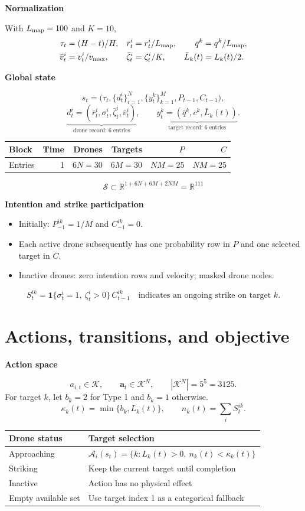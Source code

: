 \documentclass[11pt,a4paper]{article}
\newcommand{\ind}{\mathbf 1}
\newcommand{\R}{\mathbb R}
\newcommand{\lead}[1]{\medskip\textbf{#1}\par}
\begin{document}
\lead{Normalization}
With $L_{\rm map}=100$ and $K=10$,
\begin{align*}
\tau_t&=(H-t)/H,& \bar r_t^i&=r_t^i/L_{\rm map},& \bar q^k&=q^k/L_{\rm map},\\
\bar v_t^i&=v_t^i/v_{\max},& \bar\zeta_t^i&=\zeta_t^i/K,& \bar L_k(t)&=L_k(t)/2.
\end{align*}

\lead{Global state}
\[
s_t=\bigl(\tau_t,\{d_t^i\}_{i=1}^N,\{y_t^k\}_{k=1}^M,P_{t-1},C_{t-1}\bigr),
\]
\[
\underbrace{d_t^i=(\bar r_t^i,\sigma_t^i,\bar\zeta_t^i,\bar v_t^i)}_{\text{drone record: 6 entries}},
\qquad
\underbrace{y_t^k=(\bar q^k,c^k,\bar L_k(t))}_{\text{target record: 6 entries}}.
\]
\begin{center}
\begin{tabular}{@{}lrrrrr@{}}
\toprule
Block & Time & Drones & Targets & $P$ & $C$ \\
\midrule
Entries & 1 & $6N=30$ & $6M=30$ & $NM=25$ & $NM=25$ \\
\bottomrule
\end{tabular}
\end{center}
\[
\boxed{\mathcal S\subset\R^{1+6N+6M+2NM}=\R^{111}}
\]

\lead{Intention and strike participation}
\begin{itemize}
\item Initially: $P_{-1}^{ik}=1/M$ and $C_{-1}^{ik}=0$.
\item Each active drone subsequently has one probability row in $P$ and one selected target in $C$.
\item Inactive drones: zero intention rows and velocity; masked drone nodes.
\end{itemize}
\[
S_t^{ik}=\ind\{\sigma_t^i=1,\ \zeta_t^i>0\}\,C_{t-1}^{ik}
\quad\text{indicates an ongoing strike on target }k.
\]

\newpage
\section{Actions, transitions, and objective}
\lead{Action space}
\[
a_{i,t}\in\mathcal K,\qquad
\boldsymbol a_t\in\mathcal K^N,\qquad |\mathcal K^N|=5^5=3125.
\]
For target $k$, let $b_k=2$ for Type 1 and $b_k=1$ otherwise.
\[
\kappa_k(t)=\min\{b_k,L_k(t)\},\qquad n_k(t)=\sum_i S_t^{ik}.
\]
\begin{center}
\begin{tabularx}{\linewidth}{@{}lX@{}}
\toprule
Drone status & Target selection \\
\midrule
Approaching & $\mathcal A_i(s_t)=\{k:L_k(t)>0,\ n_k(t)<\kappa_k(t)\}$ \\
Striking & Keep the current target until completion \\
Inactive & Action has no physical effect \\
Empty available set & Use target index 1 as a categorical fallback \\
\bottomrule
\end{tabularx}
\end{center}
\end{document}
